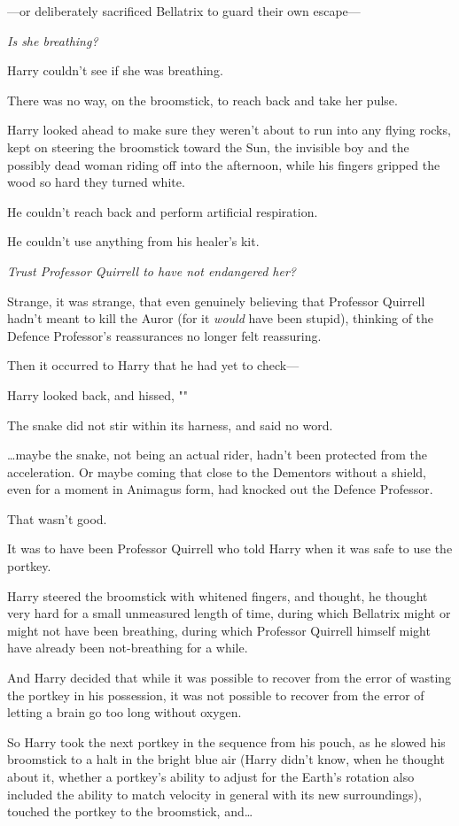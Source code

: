 ---or deliberately sacrificed Bellatrix to guard their own escape---

\emph{Is she breathing?}

Harry couldn't see if she was breathing.

There was no way, on the broomstick, to reach back and take her pulse.

Harry looked ahead to make sure they weren't about to run into any flying
rocks, kept on steering the broomstick toward the Sun, the invisible boy and
the possibly dead woman riding off into the afternoon, while his fingers
gripped the wood so hard they turned white.

He couldn't reach back and perform artificial respiration.

He couldn't use anything from his healer's kit.

\emph{Trust Professor Quirrell to have not endangered her?}

Strange, it was strange, that even genuinely believing that Professor Quirrell
hadn't meant to kill the Auror (for it \emph{would} have been stupid), thinking
of the Defence Professor's reassurances no longer felt reassuring.

Then it occurred to Harry that he had yet to check---

Harry looked back, and hissed, ""

The snake did not stir within its harness, and said no word.

{\ldots}maybe the snake, not being an actual rider, hadn't been protected from
the acceleration. Or maybe coming that close to the Dementors without a shield,
even for a moment in Animagus form, had knocked out the Defence Professor.

That wasn't good.

It was to have been Professor Quirrell who told Harry when it was safe to use
the portkey.

Harry steered the broomstick with whitened fingers, and thought, he thought
very hard for a small unmeasured length of time, during which Bellatrix might
or might not have been breathing, during which Professor Quirrell himself might
have already been not-breathing for a while.

And Harry decided that while it was possible to recover from the error of
wasting the portkey in his possession, it was not possible to recover from the
error of letting a brain go too long without oxygen.

So Harry took the next portkey in the sequence from his pouch, as he slowed his
broomstick to a halt in the bright blue air (Harry didn't know, when he thought
about it, whether a portkey's ability to adjust for the Earth's rotation also
included the ability to match velocity in general with its new surroundings),
touched the portkey to the broomstick, and{\ldots}

